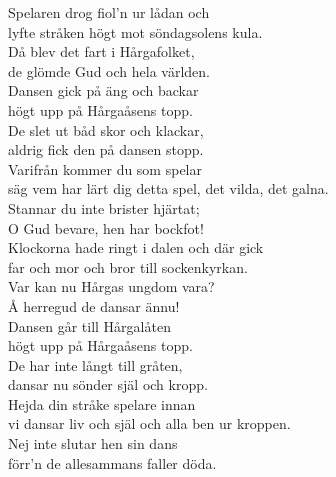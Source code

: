 \documentclass[a6paper, 10pt, twoside]{article}
\begin{document}
\noindent
\begin{center}
\end{center}
\begin{lyrics}
Spelaren drog fiol'n ur lådan och\\
lyfte stråken högt mot söndagsolens kula.\\
Då blev det fart i Hårgafolket,\\
de glömde Gud och hela världen.
\vspace{5pt}\\
Dansen gick på äng och backar\\
högt upp på Hårgaåsens topp.\\
De slet ut båd skor och klackar,\\
aldrig fick den på dansen stopp.
\vspace{5pt}\\
Varifrån kommer du som spelar\\
säg vem har lärt dig detta spel, det vilda, det galna.\\
Stannar du inte brister hjärtat;\\
O Gud bevare, hen har bockfot!
\vspace{5pt}\\
Klockorna hade ringt i dalen och där gick\\
far och mor och bror till sockenkyrkan.\\
Var kan nu Hårgas ungdom vara?\\
Å herregud de dansar ännu!
\vspace{5pt}\\
Dansen går till Hårgalåten\\
högt upp på Hårgaåsens topp.\\
De har inte långt till gråten,\\
dansar nu sönder själ och kropp.
\vspace{5pt}\\
Hejda din stråke spelare innan \\
vi dansar liv och själ och alla ben ur kroppen.\\
Nej inte slutar hen sin dans \\
förr'n de allesammans faller döda.
\end{lyrics}
\end{document}
